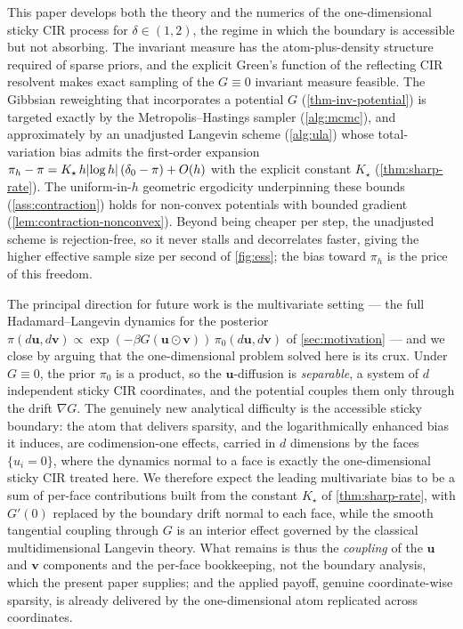 \documentclass[aap,preprint]{imsart}
\DeclarePairedDelimiter{\vpair}{|}{|} %
\newcommand\abs[2][0pt]{\vpair*{#2}} %
\renewcommand{\vec}[1]{{\mathbf{#1}}}
\numberwithin{equation}{section}
\theoremstyle{plain}
\theoremstyle{definition}
\begin{document}
This paper develops both the theory and the numerics of the one-dimensional sticky CIR process for $\delta \in (1,2)$, the regime in which the boundary is accessible but not absorbing. The invariant measure has the atom-plus-density structure required of sparse priors, and the explicit Green's function of the reflecting CIR resolvent makes exact sampling of the $G \equiv 0$ invariant measure feasible. The Gibbsian reweighting that incorporates a potential $G$ (\cref{thm-inv-potential}) is targeted exactly by the Metropolis--Hastings sampler (\cref{alg:mcmc}), and approximately by an unadjusted Langevin scheme (\cref{alg:ula}) whose total-variation bias admits the first-order expansion $\pi_h-\pi=K_\star\,h\abs{\log h } \,(\delta_0-\pi)+O(h)$ with the explicit constant $K_\star$ (\cref{thm:sharp-rate}). The uniform-in-$h$ geometric ergodicity underpinning these bounds (\cref{ass:contraction}) holds for non-convex potentials with bounded gradient (\cref{lem:contraction-nonconvex}).  Beyond being cheaper per step, the unadjusted scheme is rejection-free, so it never stalls and decorrelates faster, giving the higher effective sample size per second of \cref{fig:ess}; the bias toward $\pi_h$ is the price of this freedom.

The principal direction for future work is the multivariate setting --- the full
Hadamard--Langevin dynamics for the posterior $\pi(d\vec u,d\vec v)\propto
\exp(-\beta G(\vec u\odot \vec v))\,\pi_0(d\vec u,d\vec v)$ of
\cref{sec:motivation} --- and we close by arguing that the one-dimensional
problem solved here is its crux. Under $G\equiv0$, the prior $\pi_0$ is a product,
so the $\vec u$-diffusion is \emph{separable}, a system of $d$ independent sticky
CIR coordinates, and the potential couples them only through the drift $\nabla G$. The
genuinely new analytical difficulty is the accessible sticky boundary: the atom
that delivers sparsity, and the logarithmically enhanced bias it induces, are
codimension-one effects, carried in $d$ dimensions by the faces $\{u_i=0\}$,
where the dynamics normal to a face is exactly the one-dimensional sticky CIR
treated here. We therefore expect the leading multivariate bias to be a sum of
per-face contributions built from the constant $K_\star$ of
\cref{thm:sharp-rate}, with $G'(0)$ replaced by the boundary drift normal to
each face, while the smooth tangential coupling through $G$ is an interior
effect governed by the classical multidimensional Langevin theory. What remains is thus the
\emph{coupling} of the $\vec u$ and $\vec v$ components and the per-face
bookkeeping, not the boundary analysis, which the present paper supplies; and the
applied payoff, genuine coordinate-wise sparsity, is already delivered by the
one-dimensional atom replicated across coordinates.
%
\appendix
\end{document}
